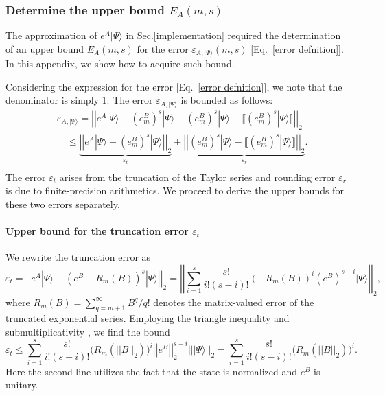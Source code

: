 \documentclass[12pt]{article}
\newcommand{\dket}[1]{|#1\rangle}
\renewcommand{\norm}[1]{\left|\left|#1\right|\right|}
\begin{document}
\subsubsection{Determine the upper bound \texorpdfstring{$E_A(m,s)$}{E\_A(m,s)}}
\label{errorupperbound}
The approximation of $e^A\dket{\Psi}$ in Sec.\ref{implementation} required the determination of an upper bound $E_A(m,s)$ for the error $\varepsilon_{A,\dket{\Psi}}(m,s)$ [Eq.\ \eqref{error defnition}]. In this appendix, we show how to acquire such bound.

Considering the expression for the error [Eq.\ \eqref{error defnition}], we note that the denominator is simply 1. The error $\varepsilon_{A,\dket{\Psi}}$ is bounded as follows:
\begin{align}
\nonumber    &\varepsilon_{A,\dket{\Psi}}
    =\norm{e^A\dket{\Psi}-(e^B_m)^s\dket{\Psi}+(e^B_m)^s\dket{\Psi}-\llbracket (e^B_m)^s\dket{\Psi}\rrbracket}_2\\
\nonumber    &\quad \leq \underbrace{\norm{e^A\dket{\Psi}-(e^B_m)^s\dket{\Psi}}_2}_{\varepsilon_t}+\underbrace{\norm{(e^B_m)^s\dket{\Psi}-\llbracket (e^B_m)^s\dket{\Psi}\rrbracket}_2}_{\varepsilon_r}.\\
\label{epsilonA}
\end{align}
The  error $\varepsilon_t$ arises from the truncation of the Taylor series  and rounding error $\varepsilon_r$ is due to finite-precision arithmetics. We proceed to derive the upper bounds for these two errors separately.

\paragraph{Upper bound for the truncation error \texorpdfstring{$\varepsilon_t$}{epsilon\_t}}
We rewrite the truncation error as
\begin{equation}
    \varepsilon_t = \norm{e^A\dket{\Psi}-(e^B-R_m(B))^s\dket{\Psi}}_2=  \norm{\sum_{i=1}^{s}\frac{s!}{i!(s-i)!} (-R_m(B))^i(e^B)^{s-i}\dket{\Psi}}_2,
\end{equation}
where $R_m(B)=\sum_{q=m+1}^{\infty}B^q/q!$ denotes the matrix-valued error of the truncated exponential series.
Employing the triangle inequality and submultiplicativity \cite{higham2002accuracy}, we find the bound
\begin{equation}
    \varepsilon_t \leq 
    \sum_{i=1}^{s}\frac{s!}{i!(s-i)!}\big(R_m(\norm{B}_2)\big)^i\norm{e^B}_2^{s-i}\norm{\dket{\Psi}}_2=\sum_{i=1}^{s}\frac{s!}{i!(s-i)!}\big(R_m(\norm{B}_2)\big)^i.
\end{equation}
Here the second line utilizes the fact that the state is normalized and $e^B$ is unitary. 
\end{document}
